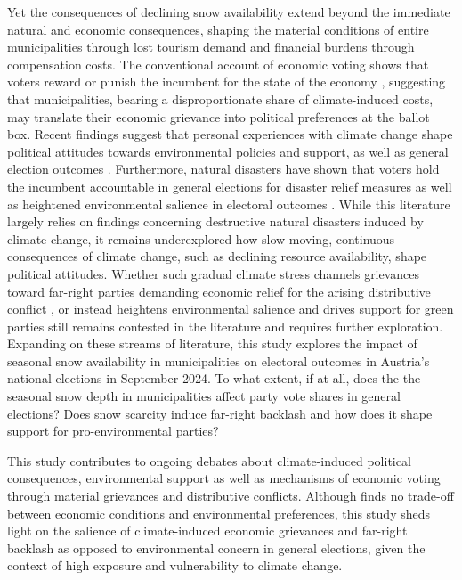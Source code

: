 \documentclass{article}
\begin{document}
Yet the consequences of declining snow availability extend beyond the immediate natural and economic consequences, shaping the material conditions of entire municipalities through lost tourism demand and financial burdens through compensation costs. The conventional account of economic voting shows that voters reward or punish the incumbent for the state of the economy \parencite{LewisBeck2000, Duch2006}, suggesting that municipalities, bearing a disproportionate share of climate-induced costs, may translate their economic grievance into political preferences at the ballot box. Recent findings suggest that personal experiences with climate change shape political attitudes towards environmental policies and support, as well as general election outcomes \parencite{egan2012, baccini2021, bechtel2011, Pink2023}. Furthermore, natural disasters have shown that voters hold the incumbent accountable in general elections for disaster relief measures as well as heightened environmental salience in electoral outcomes \parencite{bechtel2011, Pink2023}. While this literature largely relies on findings concerning destructive natural disasters induced by climate change, it remains underexplored how slow-moving, continuous consequences of climate change, such as declining resource availability, shape political attitudes. 
Whether such gradual climate stress channels grievances toward far-right parties demanding economic relief for the arising distributive conflict \parencite{Rho2017, Halikiopoulou_Vrakopoulos_Arndt_2026, Habersack2024, Margalit2019}, or instead heightens environmental salience and drives support for green parties \parencite{baccini2021, Pink2023} still remains contested in the literature and requires further exploration. 
Expanding on these streams of literature, this study explores the impact of seasonal snow availability in municipalities on electoral outcomes in Austria's national elections in September 2024. To what extent, if at all, does the the seasonal snow depth in municipalities affect party vote shares in general elections? Does snow scarcity induce far-right backlash and how does it shape support for pro-environmental parties? 

This study contributes to ongoing debates about climate-induced political consequences, environmental support as well as mechanisms of economic voting through material grievances and distributive conflicts. Although \textcite{Mildenberger2017} finds no trade-off between economic conditions and environmental preferences, this study sheds light on the salience of climate-induced economic grievances and far-right backlash as opposed to environmental concern in general elections, given the context of high exposure and vulnerability to climate change. 
\end{document}
